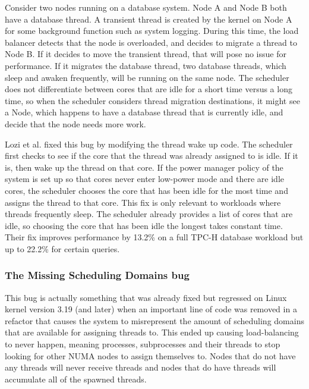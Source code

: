 \documentclass{sig-alternate}
\begin{document}
	Consider two nodes running on a database system. Node A and Node B both have a database thread. A transient thread is created by the kernel on Node A for some background function such as system logging. During this time, the load balancer detects that the node is overloaded, and decides to migrate a thread to Node B. If it decides to move the transient thread, that will pose no issue for performance. If it migrates the database thread, two database threads, which sleep and awaken frequently, will be running on the same node. The scheduler does not differentiate between cores that are idle for a short time versus a long time, so when the scheduler considers thread migration destinations, it might see a Node, which happens to have a database thread that is currently idle, and decide that the node needs more work.~\cite{Lozi:2016}

Lozi et al. fixed this bug by modifying the thread wake up code. The scheduler first checks to see if the core that the thread was already assigned to is idle. If it is, then wake up the thread on that core. If the power manager policy of the system is set up so that cores never enter low-power mode and there are idle cores, the scheduler chooses the core that has been idle for the most time and assigns the thread to that core. This fix is only relevant to workloads where threads frequently sleep. The scheduler already provides a list of cores that are idle, so choosing the core that has been idle the longest takes constant time. Their fix improves performance by 13.2\% on a full TPC-H database workload but up to 22.2\% for certain queries.~\cite{Lozi:2016}

\subsubsection{The Missing Scheduling Domains bug}
\label{sec:cfsfault_missingsched}

This bug is actually something that was already fixed but regressed on Linux kernel version 3.19 (and later) when an important line of code was removed in a refactor that causes the system to misrepresent the amount of scheduling domains that are available for assigning threads to. This ended up causing load-balancing to never happen, meaning processes, subprocesses and their threads to stop looking for other NUMA nodes to assign themselves to. Nodes that do not have any threads will never receive threads and nodes that do have threads will accumulate all of the spawned threads.
\end{document}
